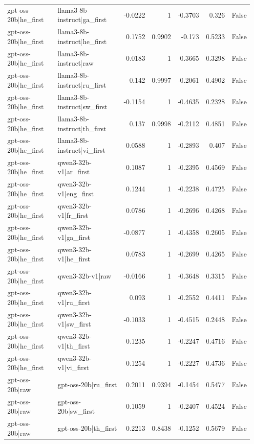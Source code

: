 \begin{table}
\begin{tabular}{l l r r r r l}
gpt-oss-20b|he_first & llama3-8b-instruct|ga_first & -0.0222 & 1 & -0.3703 & 0.326 & False \\
gpt-oss-20b|he_first & llama3-8b-instruct|he_first & 0.1752 & 0.9902 & -0.173 & 0.5233 & False \\
gpt-oss-20b|he_first & llama3-8b-instruct|raw & -0.0183 & 1 & -0.3665 & 0.3298 & False \\
gpt-oss-20b|he_first & llama3-8b-instruct|ru_first & 0.142 & 0.9997 & -0.2061 & 0.4902 & False \\
gpt-oss-20b|he_first & llama3-8b-instruct|sw_first & -0.1154 & 1 & -0.4635 & 0.2328 & False \\
gpt-oss-20b|he_first & llama3-8b-instruct|th_first & 0.137 & 0.9998 & -0.2112 & 0.4851 & False \\
gpt-oss-20b|he_first & llama3-8b-instruct|vi_first & 0.0588 & 1 & -0.2893 & 0.407 & False \\
gpt-oss-20b|he_first & qwen3-32b-v1|ar_first & 0.1087 & 1 & -0.2395 & 0.4569 & False \\
gpt-oss-20b|he_first & qwen3-32b-v1|eng_first & 0.1244 & 1 & -0.2238 & 0.4725 & False \\
gpt-oss-20b|he_first & qwen3-32b-v1|fr_first & 0.0786 & 1 & -0.2696 & 0.4268 & False \\
gpt-oss-20b|he_first & qwen3-32b-v1|ga_first & -0.0877 & 1 & -0.4358 & 0.2605 & False \\
gpt-oss-20b|he_first & qwen3-32b-v1|he_first & 0.0783 & 1 & -0.2699 & 0.4265 & False \\
gpt-oss-20b|he_first & qwen3-32b-v1|raw & -0.0166 & 1 & -0.3648 & 0.3315 & False \\
gpt-oss-20b|he_first & qwen3-32b-v1|ru_first & 0.093 & 1 & -0.2552 & 0.4411 & False \\
gpt-oss-20b|he_first & qwen3-32b-v1|sw_first & -0.1033 & 1 & -0.4515 & 0.2448 & False \\
gpt-oss-20b|he_first & qwen3-32b-v1|th_first & 0.1235 & 1 & -0.2247 & 0.4716 & False \\
gpt-oss-20b|he_first & qwen3-32b-v1|vi_first & 0.1254 & 1 & -0.2227 & 0.4736 & False \\
gpt-oss-20b|raw & gpt-oss-20b|ru_first & 0.2011 & 0.9394 & -0.1454 & 0.5477 & False \\
gpt-oss-20b|raw & gpt-oss-20b|sw_first & 0.1059 & 1 & -0.2407 & 0.4524 & False \\
gpt-oss-20b|raw & gpt-oss-20b|th_first & 0.2213 & 0.8438 & -0.1252 & 0.5679 & False \\

\end{tabular}
\end{table}
